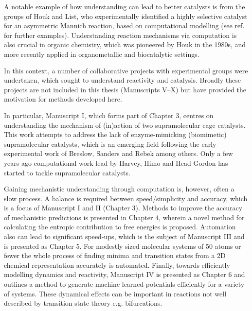\documentclass[../main.tex]{subfiles}
\begin{document}
A notable example of how understanding can lead to better catalysts is from the groups of Houk and List, who experimentally identified a highly selective catalyst for an asymmetric Mannich reaction,\cite{Mitsumori2006} based on computational modelling (see ref. \cite{Houk2008} for  further examples).\cite{Cheong2006} Understanding reaction mechanisms via computation is also crucial in organic chemistry, which was pioneered by Houk in the 1980s,\cite{Houk1986} and more recently applied in organometallic\cite{Ardkhean2020} and biocatalytic\cite{PlanasIglesias2021} settings. 

In this context, a number of collaborative projects with experimental groups were undertaken, which sought to understand reactivity and catalysis. Broadly these projects are not included in this thesis (Manuscripts \RN{5}--\RN{10}) but have provided the motivation for methods developed here.

In particular, Manuscript \RN{1}, which forms part of  Chapter 3, centres on understanding the mechanism of (in)action of two supramolecular cage catalysts. This work attempts to address the lack of enzyme-mimicking (biomimetic) supramolecular catalysts, which is an emerging field following the early experimental work of Breslow,\cite{Breslow1998}   Sanders\cite{Sanders1998} and Rebek\cite{Santamaria1999} among others. Only a few years ago computational work lead by Harvey\cite{Daver2017, Daver2018}, Himo\cite{Brea2019} and Head-Gordon\cite{Welborn2020} has started to tackle supramolecular catalysts.

Gaining mechanistic understanding through computation is, however, often a slow process. A balance is required between speed/simplicity and accuracy, which is a focus of Manuscript \RN{1} and \RN{2} (Chapter 3). Methods to improve the accuracy of mechanistic predictions is presented in Chapter 4, wherein a novel method for calculating the entropic contribution to free energies is proposed. Automation also can lead to significant speed-ups, which is the subject of Manuscript \RN{3} and is presented as Chapter 5. For modestly sized molecular systems of 50 atoms or fewer the whole process of finding minima and transition states from a 2D chemical representation accurately is automated. Finally, towards efficiently modelling dynamics and reactivity, Manuscript \RN{4} is presented as Chapter 6 and outlines a method to generate machine learned potentials efficiently for a variety of systems. These dynamical effects can be important in reactions not well described by transition state theory e.g. bifurcations.\cite{Feng2021} 
\end{document}
